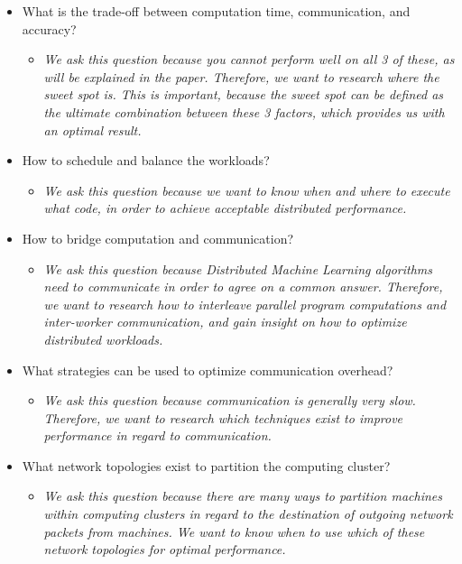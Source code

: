 \begin{itemize}
\begin{itemize}
\begin{itemize}
			\item What is the trade-off between computation time, communication, and accuracy?
			\begin{itemize}
				\item \textit{We ask this question because you cannot perform well on all 3 of these, as will be explained in the paper. Therefore, we want to research where the sweet spot is. This is important, because the sweet spot can be defined as the ultimate combination between these 3 factors, which provides us with an optimal result.}
			\end{itemize}
			\item How to schedule and balance the workloads?
			\begin{itemize}
				\item \textit{We ask this question because we want to know when and where to execute what code, in order to achieve acceptable distributed performance.}
			\end{itemize}
			\item How to bridge computation and communication?
			\begin{itemize}
				\item \textit{We ask this question because Distributed Machine Learning algorithms need to communicate in order to agree on a common answer. Therefore, we want to research how to interleave parallel program computations and inter-worker communication, and gain insight on how to optimize distributed workloads.}
			\end{itemize}
			\item What strategies can be used to optimize communication overhead?
			\begin{itemize}
				\item \textit{We ask this question because communication is generally very slow. Therefore, we want to research which techniques exist to improve performance in regard to communication.}
			\end{itemize}
			\item What network topologies exist to partition the computing cluster?
			\begin{itemize}
				\item \textit{We ask this question because there are many ways to partition machines within computing clusters in regard to the destination of outgoing network packets from machines. We want to know when to use which of these network topologies for optimal performance.}
			\end{itemize}
		\end{itemize}

\end{itemize}
\end{itemize}

